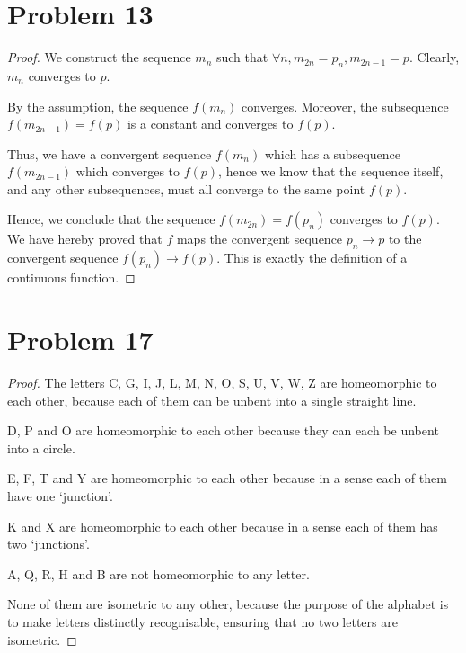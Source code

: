 \documentclass[11pt]{article}
\renewcommand{\_}[1]{\underline{ #1 }}
\theoremstyle{definition}
\numberwithin{equation}{subsection}
\begin{document}
\section*{Problem 13}
\begin{proof}
We construct the sequence $m_n$ such that $\forall n, m_{2n}=p_n, m_{2n-1}=p$. Clearly, $m_n$ converges to $p$.

By the assumption, the sequence $f(m_n)$ converges. Moreover, the subsequence $f(m_{2n-1})=f(p)$ is a constant and converges to $f(p)$. 

Thus, we have a convergent sequence $f(m_n)$ which has a subsequence $f(m_{2n-1})$ which converges to $f(p)$, hence we know that the sequence itself, and any other subsequences, must all converge to the same point $f(p)$.

Hence, we conclude that the sequence $f(m_{2n})=f(p_n)$ converges to $f(p)$. We have hereby proved that $f$ maps the convergent sequence $p_n \to p$ to the convergent sequence $f(p_n) \to f(p)$. This is exactly the definition of a continuous function.

\end{proof}

\section*{Problem 17}
\begin{proof}
The letters C, G, I, J, L, M, N, O, S, U, V, W, Z are homeomorphic to each other, because each of them can be unbent into a single straight line.

D, P and O are homeomorphic to each other because they can each be unbent into a circle.

E, F, T and Y are homeomorphic to each other because in a sense each of them have one `junction'.

K and X are homeomorphic to each other because in a sense each of them has two `junctions'.

A, Q, R, H and B are not homeomorphic to any letter.

None of them are isometric to any other, because the purpose of the alphabet is to make letters distinctly recognisable, ensuring that no two letters are isometric.

\end{proof}
\end{document}
